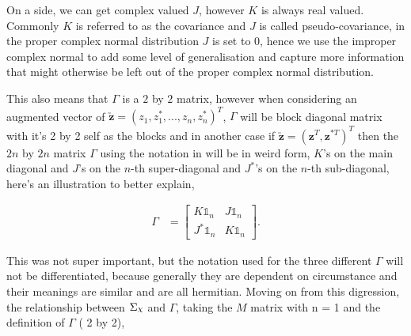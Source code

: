 \documentclass[honours,12pt]{unswthesis}
\DeclareRobustCommand{\Chi}{{\mathpalette\irchi\relax}}
\newcommand{\irchi}[2]{\raisebox{\depth}{$#1\chi$}} %
\numberwithin{equation}{section}
\begin{document}
\noindent On a side, we can get complex valued $J$, however $K$ is always real valued. Commonly $K$ is referred to as the covariance and $J$ is called pseudo-covariance, in the proper complex normal distribution $J$ is set to $0$, hence we use the improper complex normal to add some level of generalisation and capture more information that might otherwise be left out of the proper complex normal distribution. \par
\noindent This also means that $\Gamma$ is a $2$ by $2$ matrix, however when considering an augmented vector of $\utilde{\mathbf{z}} = (z_{1},  z_{1}^{*}, ..., z_{n}, z_{n}^{*})^{T}$, $\Gamma$ will be block diagonal matrix with it's 2 by 2 self as the blocks and in another case if $\utilde{\mathbf{z}} = (\mathbf{z}^{T}, \mathbf{z}^{*T})^{T}$ then the $2n$ by $2n$ matrix $\Gamma$ using the notation in  will be in weird form, $K$'s on the main diagonal and $J$'s on the $n$-th super-diagonal and $J^{*}$'s on the $n$-th sub-diagonal, here's an illustration to better explain,

\begin{align*} 
	\Gamma &= \begin{bmatrix}
		K \mathbb{1}_{n} & J \mathbb{1}_{n} \\
		J^{*} \mathbb{1}_{n} & K \mathbb{1}_{n}
	\end{bmatrix}.
\end{align*}

\noindent This was not super important, but the notation used for the three different $\Gamma$ will not be differentiated, because generally they are dependent on circumstance and their meanings are similar and are all hermitian. Moving on from this digression, the relationship between $\Sigma_{\Chi}$ and $\Gamma$, taking the $M$ matrix with n = 1 and the  definition of $\Gamma$ ( 2 by 2),
\end{document}
